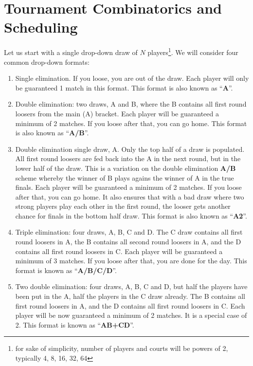 \section{Tournament Combinatorics and Scheduling}

Let us start with a single drop-down draw of $N$ 
players\footnote{for sake of simplicity, number of players and
courts will be  powers of 2, typically 4, 8, 16, 32, 64}. 
We will consider four common drop-down formats:

\begin{enumerate}
\item
Single elimination. If you loose, you are out of the draw. 
Each player will only be guaranteed 1 match in this format.
\newline
This format is also known as ``{\bf A}''.

\item
Double elimination: two draws, A and B, 
where the B contains all first round loosers from the main (A) bracket.
Each player will be guaranteed a minimum of 2 matches.
If you loose after that, you can go home.
\newline
This format is also known as ``{\bf A/B}''.

\item
Double elimination single draw, A.
Only the top half of a draw is populated. All
first round loosers are fed back into the A in the next round, but
in the lower half of the draw. This is a variation on the 
double elimination {\bf A/B} scheme whereby the winner of B plays 
agains the winner of A in the true finals.
Each player will be guaranteed a minimum of 2 matches.
If you loose after that, you can go home. It also ensures that
with a bad draw where two strong players play each other in the
first round, the looser gets another chance for finals in the
bottom half draw.
\newline
This format is also known as ``{\bf A2}''.



\item
Triple elimination: four draws, A, B, C and D. The C draw 
contains all first
round loosers in A, the B contains all second round loosers in A, and the 
D contains all first round loosers in C. 
Each player will be guaranteed a minimum of 3 matches.
If you loose after that, you are done for the day.
\newline
This format is known as ``{\bf A/B/C/D}''.


\item
Two double elimination: four draws, A, B, C and D, but half the
players have been put in the A, half the players in the C draw
already.
The B contains all first round loosers in A, and the 
D contains all first round loosers in C. 
Each player will be now guaranteed a minimum of 2 matches. It is
a special case of 2.
\newline
This format is known as ``{\bf AB+CD}''.


\end{enumerate}

